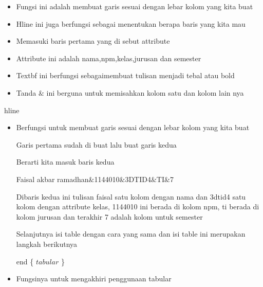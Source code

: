 \begin{itemize}
	\item Fungsi ini adalah membuat garis sesuai dengan lebar kolom yang kita buat\par

	\item Hline ini juga berfungsi sebagai menentukan berapa baris yang kita mau
\end{itemize}\par
\begin{itemize}
	\item Memasuki baris pertama yang di sebut attribute\par

	\item Attribute ini adalah nama,npm,kelas,jurusan dan semester\par

	\item Textbf ini berfungsi sebagaimembuat tulisan menjadi tebal atau bold\par

	\item Tanda $\&$ ini berguna untuk memisahkan kolom satu dan kolom lain nya
\end{itemize}\par


\noindent hline\par

\begin{itemize}
	\item Berfungsi untuk membuat garis sesuai dengan lebar kolom yang kita buat\par

Garis pertama sudah di buat lalu buat garis kedua\par

Berarti kita masuk baris kedua\par

Faisal akbar ramadhan$\&$1144010$\&$3DTID4$\&$TI$\&$7\par

Dibaris kedua ini tulisan faisal satu kolom dengan nama dan 3dtid4 satu kolom dengan attribute kelas, 1144010 ini berada di kolom npm, ti berada di kolom jurusan dan terakhir 7 adalah kolom untuk semester\par

Selanjutnya isi table dengan cara yang sama dan isi table ini merupakan langkah berikutnya\par

end \{ $tabular$ \} \par

	\item Fungsinya untuk mengakhiri penggunaan tabular
\end{itemize}\par


